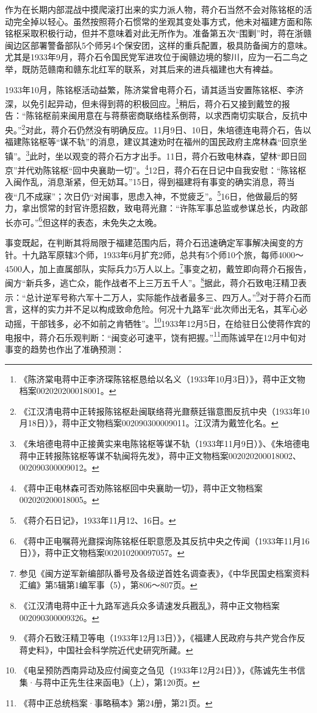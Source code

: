 作为在长期内部混战中摸爬滚打出来的实力派人物，蒋介石当然不会对陈铭枢的活动完全掉以轻心。虽然按照蒋介石惯常的坐观其变处事方式，他未对福建方面和陈铭枢采取积极行动，但并不意味着对此无所作为。准备第五次“围剿”时，蒋在浙赣闽边区部署警备部队5个师另4个保安团，这样的重兵配置，极具防备闽方的意味。尤其是1933年9月，蒋介石令国民党军进攻位于闽赣边境的黎川，应为一石二鸟之举，既防范赣南和赣东北红军的联系，对其后来的进兵福建也大有裨益。


1933年10月，陈铭枢活动益繁，陈济棠曾电蒋介石，请其适当安置陈铭枢、李济深，以免引起异动，但未得到蒋的积极回应。\footnote{《陈济棠电蒋中正李济琛陈铭枢恳给以名义（1933年10月3日）》，蒋中正文物档案002020200018001。}稍后，蒋介石又接到戴笠的报告：“陈铭枢前来闽用意在与蒋蔡密商联络桂系倒蒋，以求西南切实联合，反抗中央。”\footnote{《江汉清电蒋中正转报陈铭枢赴闽联络蒋光鼐蔡廷锴意图反抗中央（1933年10月18日）》，蒋中正文物档案002090300009011。江汉清为戴笠化名。}对此，蒋介石仍然没有明确反应。11月9日、10日，朱培德连电蒋介石，告以福建陈铭枢等“谋不轨”的消息，建议其速劝时在福州的国民政府主席林森“回京坐镇”。\footnote{《朱培德电蒋中正接黄实来电陈铭枢等谋不轨（1933年11月9日）》、《朱培德电蒋中正转报陈铭枢等谋不轨闽将先发》，蒋中正文物档案002020200018002、002090300009012。}此时，坐以观变的蒋介石方才出手。11日，蒋介石致电林森，望林“即日回京”并代劝陈铭枢“回中央襄助一切”。\footnote{《蒋中正电林森可否劝陈铭枢回中央襄助一切》，蒋中正文物档案002020200018005。}12日，蒋介石在日记中自我安慰：“陈铭枢入闽作乱，消息渐紧，但无妨耳。”15日，得到福建将有事变的确实消息，蒋当夜“几不成寐”；次日仍“对闽事，思虑入神，不觉疲乏”。\footnote{《蒋介石日记》，1933年11月12、16日。}16日，他做最后的努力，拿出惯常的封官许愿招数，致电蒋光鼐：“许陈军事总监或参谋总长，内政部长亦可。”\footnote{《蒋中正电嘱蒋光鼐探询陈铭枢任职意愿及其反抗中央之传闻（1933年11月16日）》，蒋中正文物档案002010200097057。}但这样的表态，未免失之太晚。


事变既起，在判断其将局限于福建范围内后，蒋介石迅速确定军事解决闽变的方针。十九路军原辖3个师，1933年6月扩充2师，总共有5个师10个旅，每师4000～4500人，加上直属部队，实际兵力5万人以上。\footnote{参见《闽方逆军新编部队番号及各级逆首姓名调查表》，《中华民国史档案资料汇编》第5辑第1编军事（5），第806～807页。}事变之初，戴笠即向蒋介石报告，闽方“新兵多，逃亡众，能作战者不上三万五千人”。\footnote{《江汉清电蒋中正十九路军逃兵众多请速发兵戡乱》，蒋中正文物档案002090300009326。}据此，蒋介石致电汪精卫表示：“总计逆军号称六军十二万人，实际能作战者最多三、四万人。”\footnote{《蒋介石致汪精卫等电（1933年12月13日）》，《福建人民政府与共产党合作反蒋史料》，中国社会科学院近代史研究所藏。}对于蒋介石而言，这样的实力并不足以构成致命危险。何况十九路军“此次师出无名，其军心必动摇，干部钱多，必不如前之肯牺牲”。\footnote{《电呈预防西南异动及应付闽变之刍见（1933年12月24日）》，《陈诚先生书信集·与蒋中正先生往来函电》（上），第120页。}1933年12月5日，在给驻日公使蒋作宾的电报中，蒋介石乐观判断：“闽变必可速平，饶有把握。”\footnote{《蒋中正总统档案·事略稿本》第24册，第21页。}而陈诚早在12月中旬对事变的趋势也作出了准确预测：

